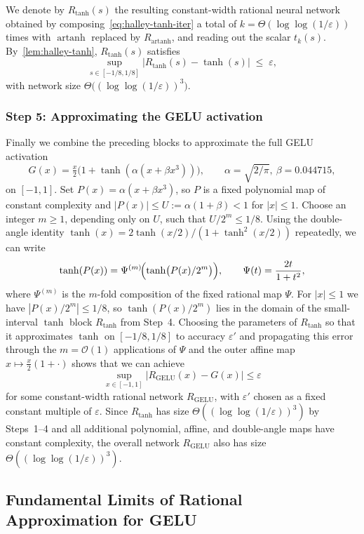 \documentclass{article}
\theoremstyle{plain}
\theoremstyle{definition}
\theoremstyle{remark}
\begin{document}
We denote by $R_{\tanh}(s)$ the resulting constant-width rational neural network obtained by composing~\cref{eq:halley-tanh-iter} a total of $k=\Theta(\log\log(1/\varepsilon))$ times with $\operatorname{artanh}$ replaced by $R_{\operatorname{artanh}}$, and reading out the scalar $t_k(s)$. By~\cref{lem:halley-tanh}, $R_{\tanh}(s)$ satisfies
\[
\sup_{s\in[-1/8,1/8]}
\bigl|R_{\tanh}(s)-\tanh(s)\bigr|
\;\le\;\varepsilon,
\]
with network size $\Theta\bigl((\log\log(1/\varepsilon))^3\bigr)$.

\subsubsection*{Step 5: Approximating the GELU activation}

Finally we combine the preceding blocks to approximate the full GELU activation
\[
G(x)=\tfrac{x}{2}\bigl(1+\tanh(\alpha(x+\beta x^3))\bigr),
\qquad \alpha=\sqrt{2/\pi},\ \beta=0.044715,
\]
on $[-1,1]$. Set $P(x)=\alpha(x+\beta x^3)$, so $P$ is a fixed polynomial map of constant complexity and $|P(x)|\le U:=\alpha(1+\beta)<1$ for $|x|\le 1$. Choose an integer $m\ge 1$, depending only on $U$, such that $U/2^m\le 1/8$. Using the double-angle identity $\tanh(x)=2\tanh(x/2)/(1+\tanh^2(x/2))$ repeatedly, we can write
\[
\tanh(P(x))=\Psi^{(m)}\!\Bigl(\tanh\bigl(P(x)/2^m\bigr)\Bigr),
\qquad
\Psi(t)=\frac{2t}{1+t^2},
\]
where $\Psi^{(m)}$ is the $m$-fold composition of the fixed rational map $\Psi$. For $|x|\le 1$ we have $|P(x)/2^m|\le 1/8$, so $\tanh(P(x)/2^m)$ lies in the domain of the small-interval $\tanh$ block $R_{\tanh}$ from Step~4. Choosing the parameters of $R_{\tanh}$ so that it approximates $\tanh$ on $[-1/8,1/8]$ to accuracy $\varepsilon'$ and propagating this error through the $m=\mathcal{O}(1)$ applications of $\Psi$ and the outer affine map $x\mapsto \tfrac{x}{2}(1+\cdot)$ shows that we can achieve
\[
\sup_{x\in[-1,1]}\bigl|R_{\mathrm{GELU}}(x)-G(x)\bigr|\le\varepsilon
\]
for some constant-width rational network $R_{\mathrm{GELU}}$, with $\varepsilon'$ chosen as a fixed constant multiple of $\varepsilon$. Since $R_{\tanh}$ has size $\Theta((\log\log(1/\varepsilon))^3)$ by Steps~1–4 and all additional polynomial, affine, and double-angle maps have constant complexity, the overall network $R_{\mathrm{GELU}}$ also has size $\Theta((\log\log(1/\varepsilon))^3)$.

\subsection*{Fundamental Limits of Rational Approximation for GELU} 
\end{document}
